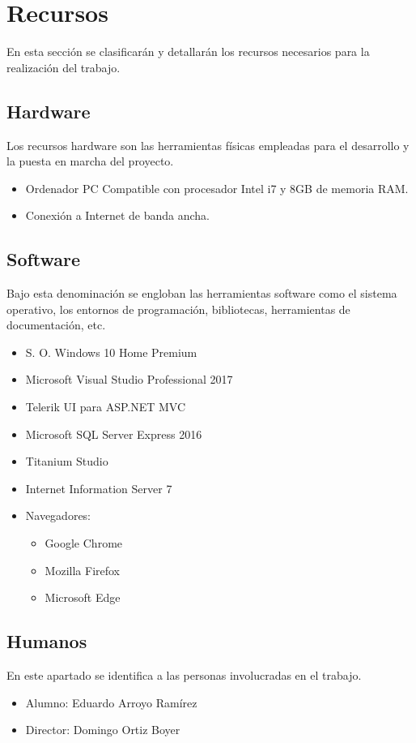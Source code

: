 \section{Recursos}
En esta sección se clasificarán y detallarán los recursos necesarios para la realización del trabajo.

\subsection{Hardware}
Los recursos hardware son las herramientas físicas empleadas para el desarrollo y la puesta en marcha del proyecto.
\begin{itemize}
    \item Ordenador PC Compatible con procesador Intel i7 y 8GB de memoria RAM.
    \item Conexión a Internet de banda ancha.
\end{itemize}

\subsection{Software}
Bajo esta denominación se engloban las herramientas software como el sistema operativo, los entornos de programación, bibliotecas, herramientas de documentación, etc.
\begin{itemize}
    \item S. O. Windows 10 Home Premium
    \item Microsoft Visual Studio Professional 2017
    \item Telerik UI para ASP.NET MVC
    \item Microsoft SQL Server Express 2016
    \item Titanium Studio
    \item Internet Information Server 7
    \item Navegadores:
        \begin{itemize}
            \item Google Chrome
            \item Mozilla Firefox
            \item Microsoft Edge
        \end{itemize}
\end{itemize}

\subsection{Humanos}
En este apartado se identifica a las personas involucradas en el trabajo.
\begin{itemize}
    \item Alumno: Eduardo Arroyo Ramírez
    \item Director: Domingo Ortiz Boyer
\end{itemize}